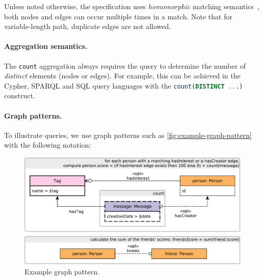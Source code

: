 Unless noted otherwise, the specification uses \emph{homomorphic} matching 
semantics~\cite{DBLP:journals/csur/AnglesABHRV17}, \ie both nodes and edges can 
occur multiple times in a match. Note that for variable-length path, duplicate 
edges are not allowed.

\paragraph{Aggregation semantics.}

The \lstinline{count} aggregation always requires the query to determine the number of \emph{distinct} elements (nodes or edges). For example, this can be achieved in the Cypher, SPARQL and SQL query languages with the \lstinline[language=sql]{count(DISTINCT ...)} construct.

\paragraph{Graph patterns.}

To illustrate queries, we use graph patterns such as \autoref{fig:example-graph-pattern} with the following notation:

\begin{figure}[ht]
	\begin{center}
		\includegraphics[scale=\yedscale,margin=0cm .2cm]{patterns/bi-read-08}
		\caption{Example graph pattern.}
		\label{fig:example-graph-pattern}
	\end{center}
\end{figure}

